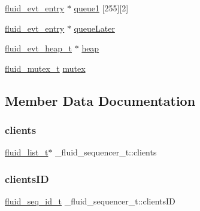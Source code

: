 \begin{DoxyCompactItemize}
\item 
\hyperlink{fluid__event__priv_8h_ae1b4d1ef2ce32890f8cb36837628a9d8}{fluid\+\_\+evt\+\_\+entry} $\ast$ \hyperlink{struct__fluid__sequencer__t_abd13dad9998224d4d985c550458d6793}{queue1} \mbox{[}255\mbox{]}\mbox{[}2\mbox{]}
\item 
\hyperlink{fluid__event__priv_8h_ae1b4d1ef2ce32890f8cb36837628a9d8}{fluid\+\_\+evt\+\_\+entry} $\ast$ \hyperlink{struct__fluid__sequencer__t_a823fb4b43eb531a2d548e095c8180408}{queue\+Later}
\item 
\hyperlink{fluid__event__priv_8h_ac90e8a0581105c6ecd80188d0bdd6693}{fluid\+\_\+evt\+\_\+heap\+\_\+t} $\ast$ \hyperlink{struct__fluid__sequencer__t_a55490ac2edf1b86ab318184adac540af}{heap}
\item 
\hyperlink{fluid__sys_8h_a7252a44982e8ed2704689f563c8a12e3}{fluid\+\_\+mutex\+\_\+t} \hyperlink{struct__fluid__sequencer__t_aae80b7e1e2a3dd9ac9fe29d7d52b8a46}{mutex}
\end{DoxyCompactItemize}


\subsection{Member Data Documentation}
\mbox{\label{struct__fluid__sequencer__t_a644f30ae8cc5e9b9871f52c3d31e22c1}} 
\subsubsection{\texorpdfstring{clients}{clients}}
{\footnotesize\ttfamily \hyperlink{fluid__list_8h_a3ef7535d4290862c0af118569223bd89}{fluid\+\_\+list\+\_\+t}$\ast$ \+\_\+fluid\+\_\+sequencer\+\_\+t\+::clients}

\mbox{\label{struct__fluid__sequencer__t_a851d4c371c4a777351f1fca1b263fc0d}} 
\subsubsection{\texorpdfstring{clients\+ID}{clientsID}}
{\footnotesize\ttfamily \hyperlink{types_8h_a69f729a00307f2b8ec1be0dba2203c12}{fluid\+\_\+seq\+\_\+id\+\_\+t} \+\_\+fluid\+\_\+sequencer\+\_\+t\+::clients\+ID}

